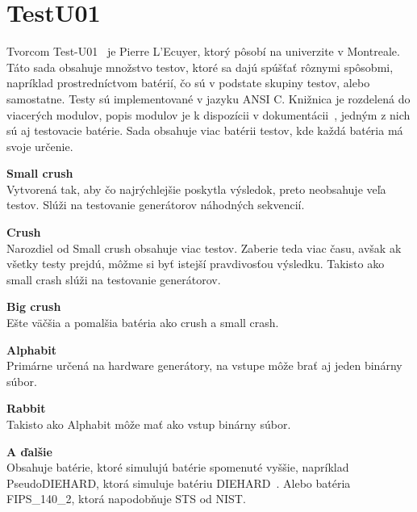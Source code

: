 \section{TestU01}
\label{sec:testu01}
Tvorcom Test-U01~\parencite{testu01} je  Pierre L’Ecuyer, ktorý pôsobí na univerzite v Montreale. Táto sada obsahuje množstvo testov, ktoré sa dajú spúšťať rôznymi spôsobmi, napríklad prostredníctvom batérií, čo sú v podstate skupiny testov, alebo samostatne. Testy sú implementované v jazyku ANSI C. Knižnica je rozdelená do viacerých modulov, popis modulov je k dispozícii v dokumentácii~\parencite{testu01-documentation}, jedným z nich sú aj testovacie batérie. Sada obsahuje viac batérii testov, kde každá batéria má svoje určenie.
\begin{myItemize}
	\item \textbf{Small crush}\\Vytvorená tak, aby čo najrýchlejšie poskytla výsledok, preto neobsahuje veľa testov. Slúži na testovanie generátorov náhodných sekvencií.
	\item \textbf{Crush}\\Narozdiel od Small crush obsahuje viac testov. Zaberie teda viac času, avšak ak všetky testy prejdú, môžme si byť istejší pravdivosťou výsledku. Takisto ako small crash slúži na testovanie generátorov.
	\item \textbf{Big crush}\\Ešte väčšia a pomalšia batéria ako crush a small crash. 
	\item \textbf{Alphabit}\\Primárne určená na hardware generátory, na vstupe môže brať aj jeden binárny súbor.
	\item \textbf{Rabbit}\\Takisto ako Alphabit môže mať ako vstup binárny súbor.
	\item \textbf{A ďalšie}\\Obsahuje batérie, ktoré simulujú batérie spomenuté vyššie, napríklad PseudoDIEHARD, ktorá simuluje batériu DIEHARD~\parencite{diehard}. Alebo batéria FIPS\_140\_2, ktorá napodobňuje STS od NIST.	 
\end{myItemize}
